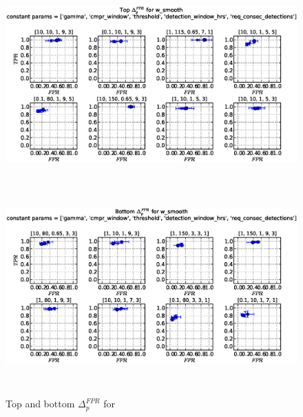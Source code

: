 \begin{figure}[!h]
\begin{center}
\includegraphics[height=3in]{../fig/final/top_fpr/w_smooth}
\includegraphics[height=3in]{../fig/final/bottom_fpr/w_smooth}
\end{center}
\caption{\label{fig:delta_top_bottom4f} Top and bottom $\Delta_p^{FPR}$ for }
\end{figure}

